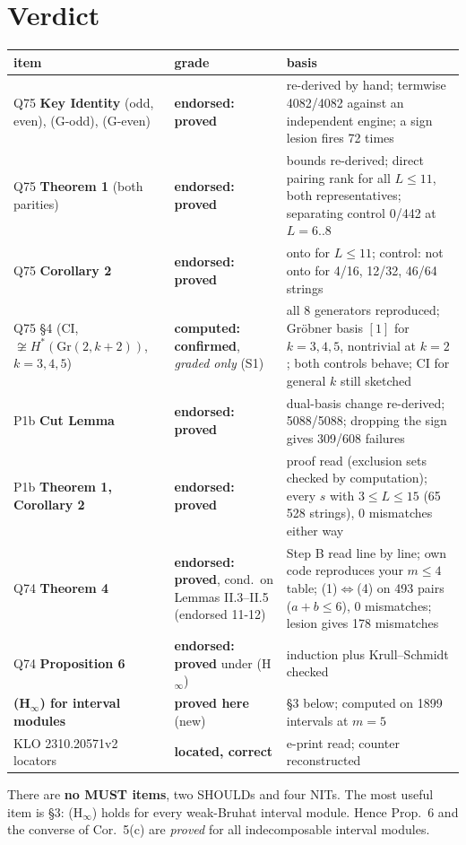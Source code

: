 \documentclass[11pt]{article}
\begin{document}
\section*{Verdict}
\begin{center}\small
\begin{tabular}{@{}p{4.3cm}p{3.0cm}p{8.6cm}@{}}
\toprule
item & grade & basis\\\midrule
Q75 \textbf{Key Identity} (odd, even), (G-odd), (G-even) & \textbf{endorsed: proved} &
re-derived by hand; termwise 4082/4082 against an independent engine; a sign lesion fires 72 times\\
Q75 \textbf{Theorem 1} (both parities) & \textbf{endorsed: proved} & bounds re-derived; direct
pairing rank for all $L\le 11$, both representatives; separating control 0/442 at $L=6..8$\\
Q75 \textbf{Corollary 2} & \textbf{endorsed: proved} & onto for $L\le11$; control: not onto for
4/16, 12/32, 46/64 strings\\
Q75 \S4 (CI, $\not\cong H^*(\mathrm{Gr}(2,k{+}2))$, $k=3,4,5$) & \textbf{computed: confirmed},
\emph{graded only} (S1) & all 8 generators reproduced; Gr\"obner basis $[1]$ for $k=3,4,5$, nontrivial at $k=2$;
both controls behave; CI for general $k$ still sketched\\
P1b \textbf{Cut Lemma} & \textbf{endorsed: proved} & dual-basis change re-derived; 5088/5088; dropping
the sign gives 309/608 failures\\
P1b \textbf{Theorem 1, Corollary 2} & \textbf{endorsed: proved} & proof read (exclusion sets checked
by computation); every $s$ with $3\le L\le15$ (65\,528 strings), 0 mismatches either way\\
Q74 \textbf{Theorem 4} & \textbf{endorsed: proved}, cond.\ on Lemmas II.3--II.5 (endorsed 11-12) &
Step B read line by line; own code reproduces your $m\le4$ table; (1)$\Leftrightarrow$(4) on 493 pairs
($a+b\le6$), 0 mismatches; lesion gives 178 mismatches\\
Q74 \textbf{Proposition 6} & \textbf{endorsed: proved} under (H$_\infty$) & induction plus Krull--Schmidt checked\\
\textbf{(H$_\infty$) for interval modules} & \textbf{proved here} (new) & \S3 below; computed on
1899 intervals at $m=5$\\
KLO 2310.20571v2 locators & \textbf{located, correct} & e-print read; counter reconstructed\\
\bottomrule
\end{tabular}
\end{center}
There are \textbf{no MUST items}, two SHOULDs and four NITs. The most useful item is \S3: (H$_\infty$) holds for every
weak-Bruhat interval module. Hence Prop.~6 and the converse of Cor.~5(c) are \emph{proved} for all
indecomposable interval modules.
\end{document}
